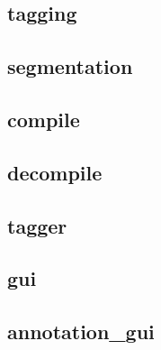 \documentclass[manual-fr.tex]{subfiles}
\begin{document}
\subsection{tagging}


\subsection{segmentation}


\subsection{compile}


\subsection{decompile}


\subsection{tagger}


\subsection{gui}


\subsection{annotation\_gui}

\end{document}
